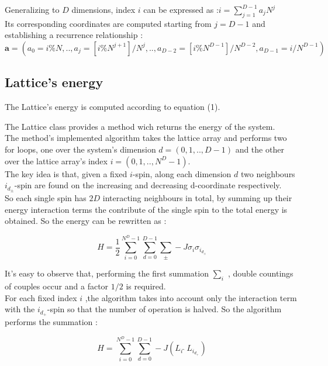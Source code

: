 \documentclass[11pt,a4paper]{article}
\begin{document}
Generalizing to $D$ dimensions, index $i$ can be expressed as :$ i = \sum_{j=1}^{D-1}a_jN^j $ \\
Its corresponding coordinates are computed starting from $j=D-1$ and establishing a recurrence relationship :
$$\mathbf{a} = \left(a_0 = i\%N ,.., a_j = [i\%N^{j+1}]/N^j ,.., a_{D-2} = [i\% N^{D-1}]/N^{D-2} , a_{D-1} = i/N^{D-1}\right)$$ 
 
 
\newpage
\subsection*{Lattice's energy } 

The Lattice's energy is computed according to equation (1).



The Lattice class provides a method wich returns the energy of the system. \\
The method's implemented algorithm takes the lattice array and performs two for loops, one over the system's dimension $d = (0,1,..,D-1)$ and the other over the lattice array's index $i = (0,1,..,N^D-1)$. \\
The key idea is that, given a fixed $i$-spin, along each dimension $d$ two neighbours $i_{d_\pm}$-spin are found on the increasing and decreasing d-coordinate respectively. 
\\So each single spin has $2D$ interacting neighbours in total, by summing up their energy interaction terms the contribute of the single spin to the total energy is obtained. So the energy can be rewritten as : 

$$H = \frac{1}{2}\sum_{i=0}^{N^D-1}\sum_{d=0}^{D-1}\sum_{\pm}^{} -J\sigma_i\sigma_{i_{d_\pm}}$$ 

It's easy to observe that, performing the first summation $\sum_{i}^{}$ , double countings of couples occur and a factor $1/2$ is required. \\ 
For each fixed index $i$ ,the algorithm takes into account only the interaction term with the 
$i_{d_+}$-spin so that the number of operation is halved. So the algorithm performs the summation :
  
$$H = \sum_{i=0}^{N^D-1}\sum_{d=0}^{D-1}-J(L_i \ \hat{} \ L_{i_{d_+}})$$ 
\end{document}
